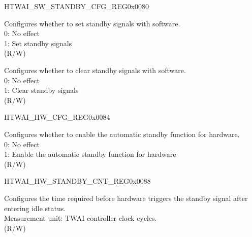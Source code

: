 \begin{register}{H}{TWAI\_SW\_STANDBY\_CFG\_REG}{0x0080}\label{regdesc:TWAISWSTANDBYCFGREG}
%
%
%
\regnewline%
\begin{regdesc}\begin{reglist}
\label{fielddesc:TWAISWSTANDBYEN}\item [TWAI\_SW\_STANDBY\_EN] Configures whether to set standby signals with software.\\
0: No effect\\
1: Set standby signals \\
(R/W)
\label{fielddesc:TWAISWSTANDBYCLR}\item [TWAI\_SW\_STANDBY\_CLR] Configures whether to clear standby signals with software. \\
0: No effect\\
1: Clear standby signals \\
(R/W)
\end{reglist}\end{regdesc}
\end{register}


\begin{register}{H}{TWAI\_HW\_CFG\_REG}{0x0084}\label{regdesc:TWAIHWCFGREG}
%
%
\regnewline%
\begin{regdesc}\begin{reglist}
\label{fielddesc:TWAIHWSTANDBYEN}\item [TWAI\_HW\_STANDBY\_EN] Configures whether to enable the automatic standby function for hardware.\\
0: No effect\\
1: Enable the automatic standby function for hardware\\(R/W)
\end{reglist}\end{regdesc}
\end{register}


\begin{register}{H}{TWAI\_HW\_STANDBY\_CNT\_REG}{0x0088}\label{regdesc:TWAIHWSTANDBYCNTREG}
%
\regnewline%
\begin{regdesc}\begin{reglist}
\label{fielddesc:TWAISTANDBYWAITCNT}\item [TWAI\_STANDBY\_WAIT\_CNT] Configures the time required before hardware triggers the standby signal after entering idle status.\\
Measurement unit: TWAI controller clock cycles.\\
(R/W)
\end{reglist}\end{regdesc}
\end{register}


